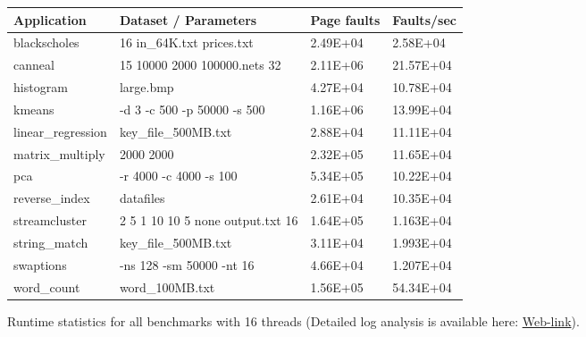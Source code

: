 \begin{figure}[t]
\centering
\myfontsize
{
\begin{tabular}{m{1.6cm}|m{3.2cm}| m{1.1cm}|m{1.3cm}}
   { Application} & Dataset / Parameters & Page faults & Faults/sec\\
  \hline \hline
    blackscholes& 16 in\_64K.txt prices.txt & 2.49E+04& 2.58E+04 \\
    canneal& 15 10000 2000 100000.nets 32 & 2.11E+06 & 21.57E+04 \\
    histogram& large.bmp & 4.27E+04 & 10.78E+04	  \\
    kmeans& -d 3 -c 500 -p 50000 -s 500 & 1.16E+06 & 13.99E+04  \\
    linear\_regression& key\_file\_500MB.txt & 2.88E+04 & 11.11E+04  \\
    matrix\_multiply& 2000 2000 & 2.32E+05 & 11.65E+04  \\
    pca& -r 4000 -c 4000 -s 100 & 5.34E+05 & 10.22E+04\\
    reverse\_index & datafiles & 2.61E+04 & 10.35E+04  \\
    streamcluster& 2 5 1 10 10 5 none output.txt 16 & 1.64E+05 & 1.163E+04\\
    string\_match &key\_file\_500MB.txt & 3.11E+04 & 1.993E+04\\
    swaptions & -ns 128 -sm 50000 -nt 16  & 4.66E+04 & 1.207E+04 \\
    word\_count& word\_100MB.txt	 & 1.56E+05 & 54.34E+04  \\

\hline
\end{tabular}
}


\caption{\label{tab:apps} Runtime statistics for all benchmarks with 16 threads (Detailed log analysis is available here: \href{https://mic92.github.io/inspector/index.html\#measurement_table}{Web-link}). }                                                                                                                                  


\end{figure}
